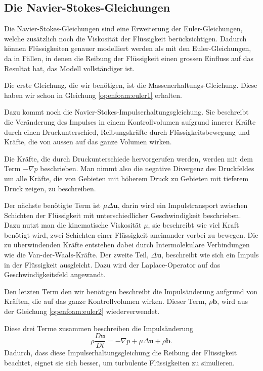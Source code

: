 \subsection{Die Navier-Stokes-Gleichungen}
Die Navier-Stokes-Gleichungen sind eine Erweiterung der Euler-Gleichungen, welche zusätzlich noch die Viskosität der Flüssigkeit berücksichtigen.
%
Dadurch können Flüssigkeiten genauer modelliert werden als mit den Euler-Gleichungen, da in Fällen, in denen die Reibung der Flüssigkeit einen grossen Einfluss auf das Resultat hat, das Modell vollständiger ist.
%
%

Die erste Gleichung, die wir benötigen, ist die Massenerhaltungs-Gleichung.
Diese haben wir schon in Gleichung \eqref{openfoam:euler1} erhalten.

Dazu kommt noch die Navier-Stokes-Impulserhaltungsgleichung.
Sie beschreibt die Veränderung des Impulses in einem Kontrollvolumen aufgrund innerer Kräfte durch einen Druckunterschied, Reibungskräfte durch Flüssigkeitsbewegung und Kräfte, die von aussen auf das ganze Volumen wirken.

Die Kräfte, die durch Druckunterschiede hervorgerufen werden, werden mit dem Term $- \nabla p$ beschrieben.
Man nimmt also die negative Divergenz des Druckfeldes um alle Kräfte, die von Gebieten mit höherem Druck zu Gebieten mit tieferem Druck zeigen, zu beschreiben.

Der nächste benötigte Term ist $\mu \Delta \mathbf{u}$, darin wird ein Impulstransport zwischen Schichten der Flüssigkeit mit unterschiedlicher Geschwindigkeit beschrieben.
Dazu nutzt man die kinematische Viskosität $\mu$, sie beschreibt wie viel Kraft benötigt wird, zwei Schichten einer Flüssigkeit aneinander vorbei zu bewegen.
%
%
Die zu überwindenden Kräfte entstehen dabei durch Intermolekulare Verbindungen wie die Van-der-Waals-Kräfte.
%
Der zweite Teil, $\Delta \mathbf{u}$, beschreibt wie sich ein Impuls in der Flüssigkeit ausgleicht.
Dazu wird der Laplace-Operator auf das Geschwindigkeitsfeld angewandt.

Den letzten Term den wir benötigen beschreibt die Impulsänderung aufgrund von Kräften, die auf das ganze Kontrollvolumen wirken.
Dieser Term, $\rho \mathbf{b}$, wird aus der Gleichung \eqref{openfoam:euler2} wiederverwendet.

Diese drei Terme zusammen beschreiben die Impulsänderung 
\begin{equation}
\rho \frac{D\mathbf{u}}{Dt}
=
- \nabla p + \mu \Delta \mathbf{u} +\rho \mathbf{b} 
.\end{equation}
Dadurch, dass diese Impulserhaltungsgleichung die Reibung der Flüssigkeit beachtet, eignet sie sich besser, um turbulente Flüssigkeiten zu simulieren. 

